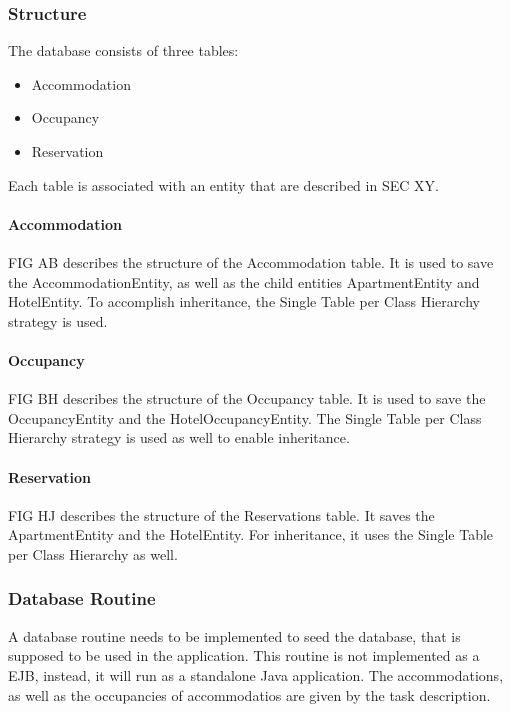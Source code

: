 \subsubsection{Structure}\label{sec:02_impl_db_structure}
The database consists of three tables:
\begin{itemize}
\item Accommodation
\item Occupancy
\item Reservation
\end{itemize}
Each table is associated with an entity that are described in SEC XY.

\paragraph{Accommodation}
FIG AB describes the structure of the Accommodation table. It is used to save the AccommodationEntity, as well as the child entities ApartmentEntity and HotelEntity.
To accomplish inheritance, the Single Table per Class Hierarchy strategy is used.

\paragraph{Occupancy}
FIG BH describes the structure of the Occupancy table. It is used to save the OccupancyEntity and the HotelOccupancyEntity.
The Single Table per Class Hierarchy strategy is used as well to enable inheritance.

\paragraph{Reservation}
FIG HJ describes the structure of the Reservations table. It saves the ApartmentEntity and the HotelEntity.
For inheritance, it uses the Single Table per Class Hierarchy as well.


\subsubsection{Database Routine}\label{sec:02_impl_db_routine}
A database routine needs to be implemented to seed the database, that is supposed to be used in the application.
This routine is not implemented as a EJB, instead, it will run as a standalone Java application.
The accommodations, as well as the occupancies of accommodatios are given by the task description.

